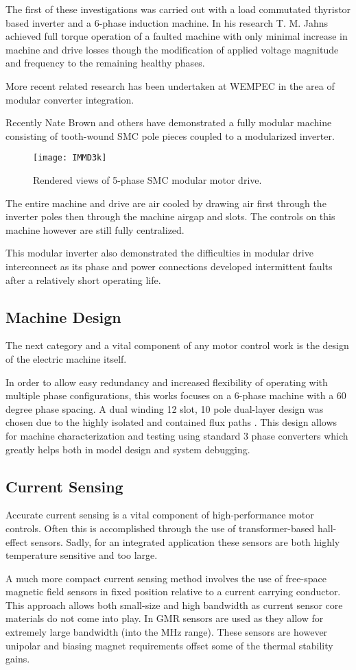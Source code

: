 The first of these investigations was carried out with a load commutated
thyristor based inverter and a 6-phase induction machine.
In his research \cite{Jahns78} T. M. Jahns achieved full torque operation of a faulted
machine with only minimal increase in machine and drive losses though the
modification of applied voltage magnitude and frequency to the remaining
healthy phases.

More recent related research has been undertaken at WEMPEC in the area of
modular converter integration.

Recently Nate Brown and others \cite{Brown07a} have demonstrated a fully
modular machine consisting of tooth-wound SMC pole pieces coupled to a
modularized inverter.
\begin{figure}[htbp]
\centering
\label{figCPESIMMD}
\texttt{[image: IMMD3k]}
\caption{Rendered views of 5-phase SMC modular motor drive.}
\end{figure}
The entire machine and drive are air cooled by drawing air first through the
inverter poles then through the machine airgap and slots.
The controls on this machine however are still fully centralized.

This modular inverter also demonstrated the difficulties in modular drive
interconnect as its phase and power connections developed intermittent faults
after a relatively short operating life.


\subsection{Machine Design}
The next category and a vital component of any motor control work is the
design of the electric machine itself.

In order to allow easy redundancy and increased flexibility of operating with
multiple phase configurations, this works focuses on a 6-phase machine with a
60 degree phase spacing.
A dual winding 12 slot, 10 pole dual-layer design was chosen due to the
highly isolated and contained flux paths \cite{Bianchi05}.
This design allows for machine characterization and testing using standard 3
phase converters which greatly helps both in model design and system
debugging.


\subsection{Current Sensing}
Accurate current sensing is a vital component of high-performance motor
controls.  Often this is accomplished through the use of transformer-based
hall-effect sensors.  Sadly, for an integrated application these sensors are
both highly temperature sensitive and too large.

A much more compact current sensing method involves the use of free-space
magnetic field sensors in fixed position relative to a current carrying
conductor.
This approach allows both small-size and high bandwidth as current sensor core
materials do not come into play.
In \cite{Schneider10} GMR sensors are used as they allow for extremely large
bandwidth (into the MHz range).
These sensors are however unipolar and biasing magnet requirements offset some
of the thermal stability gains.

